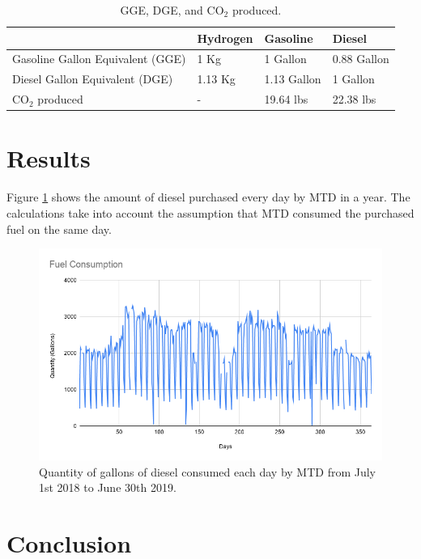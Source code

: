 \documentclass{anstrans}
\begin{document}
\begin{table}[]
	\centering
    \caption{GGE, DGE, and CO$_2$ produced.}
    \label{tab:meth}
	\begin{tabular}{l|l|l|l}
	\hline
	                                 & Hydrogen & Gasoline    & Diesel      \\ \hline
	Gasoline Gallon Equivalent (GGE) & 1 Kg     & 1 Gallon    & 0.88 Gallon \\
	Diesel Gallon Equivalent (DGE)   & 1.13 Kg  & 1.13 Gallon & 1 Gallon    \\
    CO$_2$ produced                  & -        & 19.64 lbs   & 22.38 lbs   \\ \hline

	\end{tabular}
\end{table}

\section{Results}

Figure \ref{fig:mtdfuel} shows the amount of diesel purchased every day by MTD in a year. The calculations take into account the assumption that MTD consumed the purchased fuel on the same day.

\begin{figure}[]
	\centering
	\includegraphics[width=0.4\linewidth]{figures/fuelconsumption.png}
	\hfill
	\caption{Quantity of gallons of diesel consumed each day by MTD from July 1st 2018 to June 30th 2019.}
	\label{fig:mtdfuel}
\end{figure}

\section{Conclusion}



\end{document}
